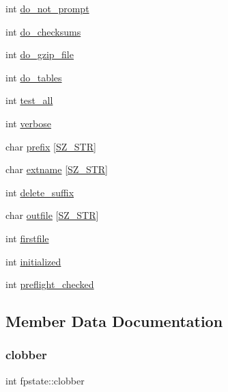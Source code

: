 \begin{DoxyCompactItemize}
\item 
int \hyperlink{structfpstate_aeeb3d795ec6b766686a0bc8b25628242}{do\+\_\+not\+\_\+prompt}
\item 
int \hyperlink{structfpstate_a9554b6a996ed20a88af965dafb4adcfd}{do\+\_\+checksums}
\item 
int \hyperlink{structfpstate_a9fca511994a78324aa409ecc65bf500b}{do\+\_\+gzip\+\_\+file}
\item 
int \hyperlink{structfpstate_a78daa59a921bb5453d3192974782611c}{do\+\_\+tables}
\item 
int \hyperlink{structfpstate_a6e44a8cac2e7e4be04898e34696e9810}{test\+\_\+all}
\item 
int \hyperlink{structfpstate_ae8ee1c7a7d279650903ed88fa4b7bb01}{verbose}
\item 
char \hyperlink{structfpstate_a54656a3b2380f099b7fdf8ab3e79f4ad}{prefix} \mbox{[}\hyperlink{fpack_8h_a4ad6b27302c290b31000b9d7b537959c}{S\+Z\+\_\+\+S\+TR}\mbox{]}
\item 
char \hyperlink{structfpstate_a7b822abf7ad6c4a1fd4f223582ec1e9a}{extname} \mbox{[}\hyperlink{fpack_8h_a4ad6b27302c290b31000b9d7b537959c}{S\+Z\+\_\+\+S\+TR}\mbox{]}
\item 
int \hyperlink{structfpstate_a5751ca06e46e2bcf73d1b01ca5073c61}{delete\+\_\+suffix}
\item 
char \hyperlink{structfpstate_aafd3cf561870e0cb4240b9e3dd7a0f61}{outfile} \mbox{[}\hyperlink{fpack_8h_a4ad6b27302c290b31000b9d7b537959c}{S\+Z\+\_\+\+S\+TR}\mbox{]}
\item 
int \hyperlink{structfpstate_ab8facd8853ff4bb210c56939bc4ae187}{firstfile}
\item 
int \hyperlink{structfpstate_a7b5c21b1e39a2fc97b21b93f7ce15f1d}{initialized}
\item 
int \hyperlink{structfpstate_aed261e89ac88d64d441b135f071a6d6e}{preflight\+\_\+checked}
\end{DoxyCompactItemize}


\subsection{Member Data Documentation}
\mbox{\label{structfpstate_a8aea839280f5037b1cd8cfd34f0fa780}} 
\subsubsection{\texorpdfstring{clobber}{clobber}}
{\footnotesize\ttfamily int fpstate\+::clobber}

